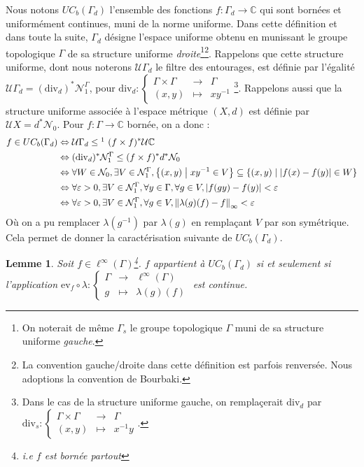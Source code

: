 \documentclass[a4paper,12pt]{article}
\newtheorem{lemma}[theorem]{Lemme}
\newcommand{\C}{\mathbb{C}}
\newcommand{\ev}{\mathrm{ev}}
\newcommand{\norm}[1]{\left\Vert #1\right\Vert}
\newcommand{\abs}[1]{\left\vert#1\right\vert}
\newcommand{\set}[1]{\left\{ #1 \right\}}
\newcommand\fundef[3]{#1: \left\{\begin{array}{ccc}#2\\#3\end{array}\right.}
\newcommand{\tq}{\;\middle|\;}
\newcommand{\ssi}{si et seulement si }
\newcommand{\inv}{^{-1}}
\newcommand{\comp}{\circ}
\newcommand{\nhds}{\mathcal{N}}
\renewcommand{\iff}{\Leftrightarrow}
\newcommand{\divop}{\mathrm{div}}
\begin{document}
Nous notons $UC_b(\Gamma_d)$ l'ensemble des fonctions $f:\Gamma_d\to\C$ qui sont bornées et uniformément 
continues, muni de la norme uniforme. Dans cette définition et dans toute la suite, $\Gamma_d$ désigne l'espace uniforme obtenu 
en munissant le groupe topologique $\Gamma$ de sa structure uniforme \emph{droite}\footnote{On noterait de même $\Gamma_s$
le groupe topologique $\Gamma$ muni de sa structure uniforme \emph{gauche}.}\footnote{La convention \og{}gauche/droite\fg{} 
dans cette définition est parfois renversée. Nous adoptions la convention de Bourbaki.}.
Rappelons que cette structure uniforme, dont nous noterons $\mathcal{U}\Gamma_d$ le filtre des entourages,
est définie par l'égalité $\mathcal{U}\Gamma_d=(\divop_d)^*\nhds_1^\Gamma$, pour 
$\fundef{\divop_d}{\Gamma\times\Gamma&\to&\Gamma}{(x, y)&\mapsto&x y\inv}$\footnote{Dans le cas de la structure 
uniforme gauche, on remplaçerait $\divop_d$ par $\fundef{\divop_s}{\Gamma\times\Gamma&\to&\Gamma}{(x, y)&\mapsto&x\inv y}$.}.
Rappelons aussi que la structure uniforme associée à l'espace métrique $(X, d)$ est définie par 
$\mathcal{U}X = d^*\nhds_0$. 
Pour $f:\Gamma\to\C$ bornée, on a donc : 
\begin{align}
    f\in UC_b(\Gamma_d)
        &\iff \mathcal{U}\Gamma_d \le\footnotemark\ (f\times f)^*\mathcal{U}\C \nonumber \\
        &\iff (\divop_d)^*\nhds_1^\Gamma \le (f\times f)^*d^*\nhds_0 \nonumber \\
        &\iff \forall W\in\nhds_0, \exists V\in\nhds_1^\Gamma, \set{(x, y)\tq x y\inv\in V} \subseteq \set{(x, y)\tq \abs{f(x)-f(y)}\in W} \nonumber \\
        &\iff \forall \varepsilon>0, \exists V\in\nhds_1^\Gamma, \forall y\in\Gamma, \forall g\in V, \abs{f(gy)-f(y)} < \varepsilon \nonumber \\
        &\iff \forall \varepsilon>0, \exists V\in\nhds_1^\Gamma, \forall g\in V, \norm{\lambda(g)(f) - f}_\infty < \varepsilon \label{UCB_explicit_cara}
\end{align}
Où on a pu remplacer $\lambda(g\inv)$ par $\lambda(g)$ en remplaçant $V$ par son symétrique. Cela permet de donner la caractérisation suivante de $UC_b(\Gamma_d)$.

\begin{lemma}\label{UCB_iff_translate}
    Soit $f\in\ell^\infty(\Gamma)$\footnote{i.e $f$ est bornée \emph{partout}}. $f$ appartient à $UC_b(\Gamma_d)$ \ssi l'application 
    $\fundef{\ev_f\comp\lambda}{\Gamma&\to&\ell^\infty(\Gamma)}{g&\mapsto&\lambda(g)(f)}$
    est continue.
\end{lemma}
\end{document}
